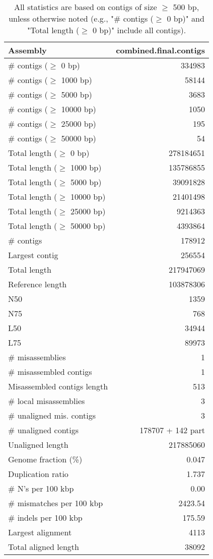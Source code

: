 \documentclass[12pt,a4paper]{article}
\begin{document}
\begin{table}[ht]
\begin{center}
\caption{All statistics are based on contigs of size $\geq$ 500 bp, unless otherwise noted (e.g., "\# contigs ($\geq$ 0 bp)" and "Total length ($\geq$ 0 bp)" include all contigs).}
\begin{tabular}{|l*{1}{|r}|}
\hline
Assembly & combined.final.contigs \\ \hline
\# contigs ($\geq$ 0 bp) & 334983 \\ \hline
\# contigs ($\geq$ 1000 bp) & 58144 \\ \hline
\# contigs ($\geq$ 5000 bp) & 3683 \\ \hline
\# contigs ($\geq$ 10000 bp) & 1050 \\ \hline
\# contigs ($\geq$ 25000 bp) & 195 \\ \hline
\# contigs ($\geq$ 50000 bp) & 54 \\ \hline
Total length ($\geq$ 0 bp) & 278184651 \\ \hline
Total length ($\geq$ 1000 bp) & 135786855 \\ \hline
Total length ($\geq$ 5000 bp) & 39091828 \\ \hline
Total length ($\geq$ 10000 bp) & 21401498 \\ \hline
Total length ($\geq$ 25000 bp) & 9214363 \\ \hline
Total length ($\geq$ 50000 bp) & 4393864 \\ \hline
\# contigs & 178912 \\ \hline
Largest contig & 256554 \\ \hline
Total length & 217947069 \\ \hline
Reference length & 103878306 \\ \hline
N50 & 1359 \\ \hline
N75 & 768 \\ \hline
L50 & 34944 \\ \hline
L75 & 89973 \\ \hline
\# misassemblies & 1 \\ \hline
\# misassembled contigs & 1 \\ \hline
Misassembled contigs length & 513 \\ \hline
\# local misassemblies & 3 \\ \hline
\# unaligned mis. contigs & 3 \\ \hline
\# unaligned contigs & 178707 + 142 part \\ \hline
Unaligned length & 217885060 \\ \hline
Genome fraction (\%) & 0.047 \\ \hline
Duplication ratio & 1.737 \\ \hline
\# N's per 100 kbp & 0.00 \\ \hline
\# mismatches per 100 kbp & 2423.54 \\ \hline
\# indels per 100 kbp & 175.59 \\ \hline
Largest alignment & 4113 \\ \hline
Total aligned length & 38092 \\ \hline
\end{tabular}
\end{center}
\end{table}
\end{document}

